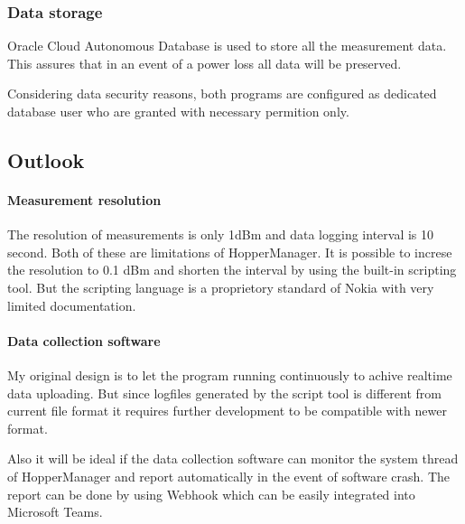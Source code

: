 \subsubsection{Data storage}

Oracle Cloud Autonomous Database is used to store all the measurement data. This assures that in
an event of a power loss all data will be preserved.

Considering data security reasons, both programs are configured as dedicated database user
who are granted with necessary permition only.

\subsection{Outlook}
\paragraph{Measurement resolution}
The resolution of measurements is only 1dBm and data logging interval is 10 second. Both of these are limitations
of HopperManager. It is possible to increse the resolution to 0.1 dBm and shorten the interval by using the built-in 
scripting tool. But the scripting language is a proprietory standard of Nokia with very limited documentation.

\paragraph{Data collection software}
My original design is to let the program running continuously to achive realtime data uploading.
But since logfiles generated by the script tool is different from current file format it requires
further development to be compatible with newer format.

Also it will be ideal if the data collection software can monitor the system thread of HopperManager
and report automatically in the event of software crash.
The report can be done by using Webhook which can be easily integrated into Microsoft Teams.